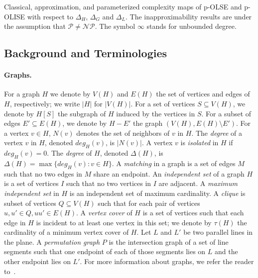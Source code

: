 \documentclass[11pt]{article}
\newcommand{\Pol}{\mbox{$\mathcal P$}}
\newcommand{\NP}{\mbox{$\mathcal{NP}$}}
\begin{document}
\begin{table}[htbp]
\begin{center}
\caption{Classical, approximation, and parameterized complexity maps of p-OLSE and p-OLISE with respect to $\Delta_H$, $\Delta_G$ and $\Delta_L$. The inapproximability results are under the assumption that $\Pol \neq \NP$. The symbol $\infty$ stands for unbounded degree.}
\end{center} \vspace*{-0.5cm}
\end{table}

\subsection{Background and Terminologies}\label{sec:background}
\paragraph{Graphs.} For a graph $H$ we denote by $V(H)$ and $E(H)$ the set of vertices and edges of $H$, respectively; we write $|H|$ for $|V(H)|$.  For a set of vertices $S \subseteq V(H)$, we denote by $H[S]$ the subgraph of $H$ induced by the vertices in $S$. For a subset of edges $E' \subseteq E(H)$, we denote by $H-E'$ the graph $(V(H), E(H) \setminus E')$. For a vertex $v \in H$, $N(v)$ denotes the set of neighbors of $v$ in $H$. The {\em degree} of a vertex $v$ in $H$, denoted $deg_H(v)$, is $|N(v)|$.  A vertex $v$ is {\em isolated} in $H$ if $deg_H(v)=0$. The {\em degree} of $H$, denoted $\Delta(H)$, is $\Delta(H) = \max\{deg_H(v): v \in H\}$. A {\em matching} in a graph is a set of edges $M$ such that no two edges in $M$ share an endpoint. An {\em independent set} of a graph $H$ is a set of vertices $I$ such that no two vertices in $I$ are adjacent.  A {\em maximum independent set} in $H$ is an independent set of maximum cardinality.  A {\em clique} is subset of vertices $Q \subseteq V(H)$ such that for each pair of vertices $u, u' \in Q, uu' \in E(H)$.  A {\em vertex cover} of $H$ is a set of vertices such that each edge in $H$ is incident to at least one vertex in this set; we denote by $\tau(H)$ the cardinality of a minimum vertex cover of $H$. Let $L$ and $L'$ be two parallel lines in the plane. A {\em permutation graph} $P$ is the intersection graph of a set of line segments such that one endpoint of each of those segments lies on $L$ and the other endpoint lies on $L'$. For more information about graphs, we refer the reader to~\cite{west}.
\end{document}
